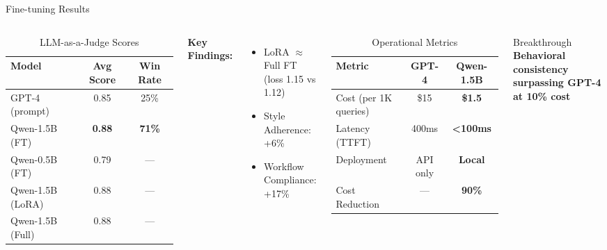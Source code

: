\documentclass[aspectratio=169]{beamer}
\begin{document}
\begin{frame}{Fine-tuning Results}
\begin{columns}[T]
\begin{table}
\centering
\caption{LLM-as-a-Judge Scores}
\scriptsize
\begin{tabular}{lcc}
\toprule
\textbf{Model} & \textbf{Avg Score} & \textbf{Win Rate} \\
\midrule
GPT-4 (prompt) & 0.85 & 25\% \\
\rowcolor{green!20}
Qwen-1.5B (FT) & \textbf{0.88} & \textbf{71\%} \\
\midrule
Qwen-0.5B (FT) & 0.79 & — \\
Qwen-1.5B (LoRA) & 0.88 & — \\
Qwen-1.5B (Full) & 0.88 & — \\
\bottomrule
\end{tabular}
\end{table}

\textbf{Key Findings:}
\begin{itemize}
    \item LoRA $\approx$ Full FT (loss 1.15 vs 1.12)
    \item Style Adherence: +6\%
    \item Workflow Compliance: +17\%
\end{itemize}

\begin{table}
\centering
\caption{Operational Metrics}
\scriptsize
\begin{tabular}{lcc}
\toprule
\textbf{Metric} & \textbf{GPT-4} & \textbf{Qwen-1.5B} \\
\midrule
Cost (per 1K queries) & \$15 & \textcolor{torusgreen}{\textbf{\$1.5}} \\
Latency (TTFT) & 400ms & \textcolor{torusgreen}{\textbf{<100ms}} \\
Deployment & API only & \textcolor{torusgreen}{\textbf{Local}} \\
\midrule
Cost Reduction & — & \textcolor{torusgreen}{\textbf{90\%}} \\
\bottomrule
\end{tabular}
\end{table}

\vspace{0.3cm}
\begin{alertblock}{Breakthrough}
\textbf{Behavioral consistency surpassing GPT-4 at 10\% cost}
\end{alertblock}
\end{columns}
\end{frame}
\end{document}
